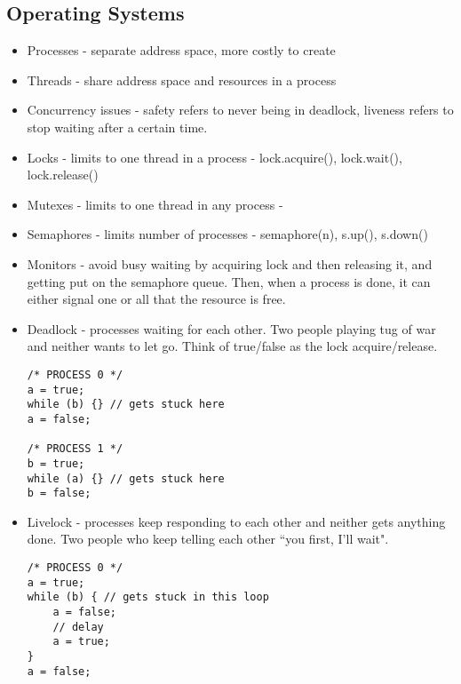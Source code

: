 \documentclass{article}
\begin{document}
\subsection{Operating Systems}
\begin{itemize}
    \item Processes - separate address space, more costly to create
    \item Threads - share address space and resources in a process
    \item Concurrency issues - safety refers to never being in deadlock, liveness refers to stop waiting after a certain time.
    \item Locks - limits to one thread in a process - lock.acquire(), lock.wait(), lock.release()
    \item Mutexes - limits to one thread in any process - 
    \item Semaphores - limits number of processes - semaphore(n), s.up(), s.down()
    \item Monitors - avoid busy waiting by acquiring lock and then releasing it, and getting put on the semaphore queue. Then, when a process is done, it can either signal one or all that the resource is free.
    \item Deadlock - processes waiting for each other. Two people playing tug of war and neither wants to let go. Think of true/false as the lock acquire/release.
    \begin{lstlisting}
/* PROCESS 0 */
a = true; 
while (b) {} // gets stuck here
a = false; 

/* PROCESS 1 */
b = true;
while (a) {} // gets stuck here
b = false;
    \end{lstlisting}
    \item Livelock - processes keep responding to each other and neither gets anything done. Two people who keep telling each other ``you first, I'll wait".
\begin{lstlisting}
/* PROCESS 0 */
a = true; 
while (b) { // gets stuck in this loop
    a = false;
    // delay
    a = true;
}
a = false; 


\end{lstlisting}
\end{itemize}
\end{document}
